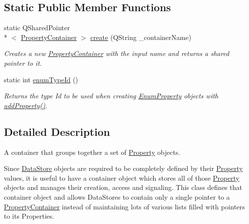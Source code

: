 \subsection*{Static Public Member Functions}
\begin{DoxyCompactItemize}
\item 
static Q\-Shared\-Pointer\\*
$<$ \hyperlink{class_picto_1_1_property_container}{Property\-Container} $>$ \hyperlink{class_picto_1_1_property_container_ab4b5c304d864c92b60bd9a7d3c0e34fd}{create} (Q\-String \-\_\-container\-Name)
\begin{DoxyCompactList}\small\item\em Creates a new \hyperlink{class_picto_1_1_property_container}{Property\-Container} with the input name and returns a shared pointer to it. \end{DoxyCompactList}\item 
static int \hyperlink{class_picto_1_1_property_container_af9d2775a07e882dc28967b0eadabf5c9}{enum\-Type\-Id} ()
\begin{DoxyCompactList}\small\item\em Returns the type Id to be used when creating \hyperlink{class_picto_1_1_enum_property}{Enum\-Property} objects with \hyperlink{class_picto_1_1_property_container_af755b156820780131812523d562daa82}{add\-Property()}. \end{DoxyCompactList}\end{DoxyCompactItemize}


\subsection{Detailed Description}
A container that groups together a set of \hyperlink{class_picto_1_1_property}{Property} objects. 

Since \hyperlink{class_picto_1_1_data_store}{Data\-Store} objects are required to be completely defined by their \hyperlink{class_picto_1_1_property}{Property} values, it is useful to have a container object which stores all of those \hyperlink{class_picto_1_1_property}{Property} objects and manages their creation, access and signaling. This class defines that container object and allows Data\-Stores to contain only a single pointer to a \hyperlink{class_picto_1_1_property_container}{Property\-Container} instead of maintaining lots of various lists filled with pointers to its Properties.

